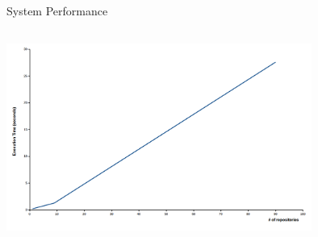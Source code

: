\begin{frame}
	\begin{block}{System Performance}
	\begin{center}
	\includegraphics[width=10cm, height=7cm]{images/Execution.png}
	\end{center}
	\end{block}	
\end{frame}
